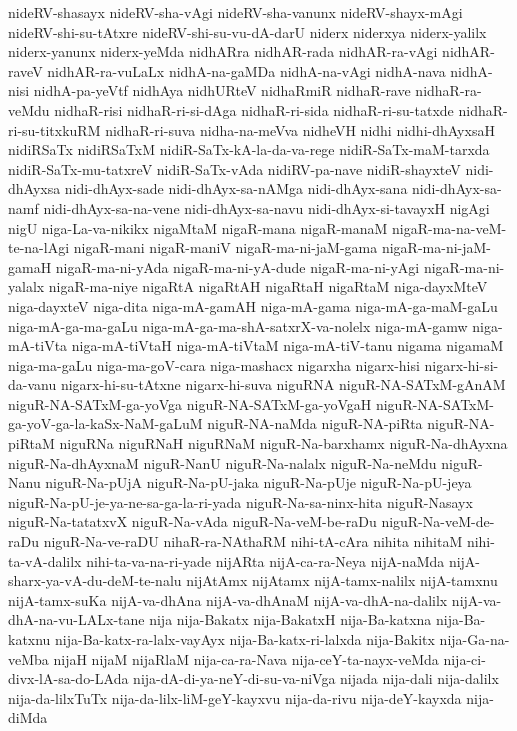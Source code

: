{nideRV-shasayx
nideRV-sha-vAgi
nideRV-sha-vanunx
nideRV-shayx-mAgi
nideRV-shi-su-tAtxre
nideRV-shi-su-vu-dA-darU
niderx
niderxya
niderx-yalilx
niderx-yanunx
niderx-yeMda
nidhARra
nidhAR-rada
nidhAR-ra-vAgi
nidhAR-raveV
nidhAR-ra-vuLaLx
nidhA-na-gaMDa
nidhA-na-vAgi
nidhA-nava
nidhA-nisi
nidhA-pa-yeVtf
nidhAya
nidhURteV
nidhaRmiR
nidhaR-rave
nidhaR-ra-veMdu
nidhaR-risi
nidhaR-ri-si-dAga
nidhaR-ri-sida
nidhaR-ri-su-tatxde
nidhaR-ri-su-titxkuRM
nidhaR-ri-suva
nidha-na-meVva
nidheVH
nidhi
nidhi-dhAyxsaH
nidiRSaTx
nidiRSaTxM
nidiR-SaTx-kA-la-da-va-rege
nidiR-SaTx-maM-tarxda
nidiR-SaTx-mu-tatxreV
nidiR-SaTx-vAda
nidiRV-pa-nave
nidiR-shayxteV
nidi-dhAyxsa
nidi-dhAyx-sade
nidi-dhAyx-sa-nAMga
nidi-dhAyx-sana
nidi-dhAyx-sa-namf
nidi-dhAyx-sa-na-vene
nidi-dhAyx-sa-navu
nidi-dhAyx-si-tavayxH
nigAgi
nigU
niga-La-va-nikikx
nigaMtaM
nigaR-mana
nigaR-manaM
nigaR-ma-na-veM-te-na-lAgi
nigaR-mani
nigaR-maniV
nigaR-ma-ni-jaM-gama
nigaR-ma-ni-jaM-gamaH
nigaR-ma-ni-yAda
nigaR-ma-ni-yA-dude
nigaR-ma-ni-yAgi
nigaR-ma-ni-yalalx
nigaR-ma-niye
nigaRtA
nigaRtAH
nigaRtaH
nigaRtaM
niga-dayxMteV
niga-dayxteV
niga-dita
niga-mA-gamAH
niga-mA-gama
niga-mA-ga-maM-gaLu
niga-mA-ga-ma-gaLu
niga-mA-ga-ma-shA-satxrX-va-nolelx
niga-mA-gamw
niga-mA-tiVta
niga-mA-tiVtaH
niga-mA-tiVtaM
niga-mA-tiV-tanu
nigama
nigamaM
niga-ma-gaLu
niga-ma-goV-cara
niga-mashacx
nigarxha
nigarx-hisi
nigarx-hi-si-da-vanu
nigarx-hi-su-tAtxne
nigarx-hi-suva
niguRNA
niguR-NA-SATxM-gAnAM
niguR-NA-SATxM-ga-yoVga
niguR-NA-SATxM-ga-yoVgaH
niguR-NA-SATxM-ga-yoV-ga-la-kaSx-NaM-gaLuM
niguR-NA-naMda
niguR-NA-piRta
niguR-NA-piRtaM
niguRNa
niguRNaH
niguRNaM
niguR-Na-barxhamx
niguR-Na-dhAyxna
niguR-Na-dhAyxnaM
niguR-NanU
niguR-Na-nalalx
niguR-Na-neMdu
niguR-Nanu
niguR-Na-pUjA
niguR-Na-pU-jaka
niguR-Na-pUje
niguR-Na-pU-jeya
niguR-Na-pU-je-ya-ne-sa-ga-la-ri-yada
niguR-Na-sa-ninx-hita
niguR-Nasayx
niguR-Na-tatatxvX
niguR-Na-vAda
niguR-Na-veM-be-raDu
niguR-Na-veM-de-raDu
niguR-Na-ve-raDU
nihaR-ra-NAthaRM
nihi-tA-cAra
nihita
nihitaM
nihi-ta-vA-dalilx
nihi-ta-va-na-ri-yade
nijARta
nijA-ca-ra-Neya
nijA-naMda
nijA-sharx-ya-vA-du-deM-te-nalu
nijAtAmx
nijAtamx
nijA-tamx-nalilx
nijA-tamxnu
nijA-tamx-suKa
nijA-va-dhAna
nijA-va-dhAnaM
nijA-va-dhA-na-dalilx
nijA-va-dhA-na-vu-LALx-tane
nija
nija-Bakatx
nija-BakatxH
nija-Ba-katxna
nija-Ba-katxnu
nija-Ba-katx-ra-lalx-vayAyx
nija-Ba-katx-ri-lalxda
nija-Bakitx
nija-Ga-na-veMba
nijaH
nijaM
nijaRlaM
nija-ca-ra-Nava
nija-ceY-ta-nayx-veMda
nija-ci-divx-lA-sa-do-LAda
nija-dA-di-ya-neY-di-su-va-niVga
nijada
nija-dali
nija-dalilx
nija-da-lilxTuTx
nija-da-lilx-liM-geY-kayxvu
nija-da-rivu
nija-deY-kayxda
nija-diMda
}
